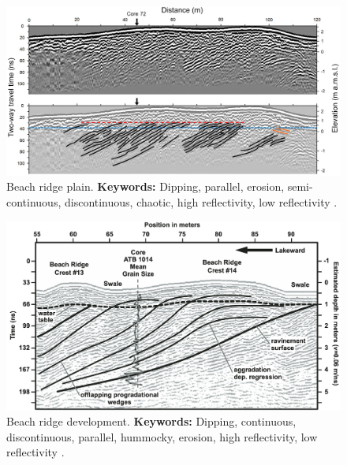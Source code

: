 \begin{figure}[h!]
    \centering
    \includegraphics[width=0.9\linewidth]{Figures/0.2GPR/Nooren_2017_beach.png}
    \caption[Beach ridge plain.]{Beach ridge plain. \textbf{Keywords: } Dipping, parallel, erosion, semi-continuous, discontinuous, chaotic, high reflectivity, low reflectivity \citep{Nooren2017}.}
    \label{fig:Nooren2017-1}
\end{figure}

\begin{figure}[h!]
    \centering
    \includegraphics[width=0.9\linewidth]{Figures/0.2GPR/Johnston2007-2.png}
    \caption[Beach ridge development.]{Beach ridge development. \textbf{Keywords: } Dipping, continuous, discontinuous, parallel, hummocky, erosion, high reflectivity, low reflectivity \citep{Johnston2007}.}
\end{figure} 


